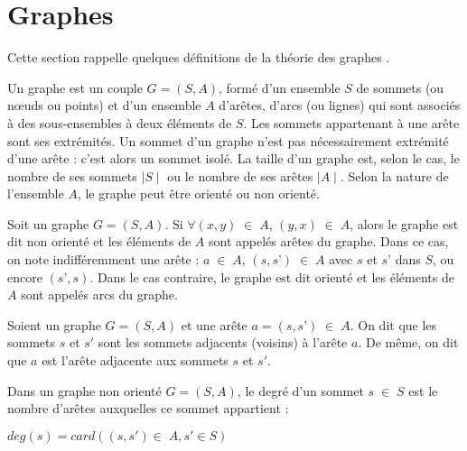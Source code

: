 
\section{Graphes}
Cette section rappelle quelques définitions de la théorie des graphes \citep{Francois2013}.

\begin{definition}[Graphe]
	Un graphe est un couple $G= (S, A)$, formé d'un ensemble $S$ de sommets (ou nœuds ou points) et d'un ensemble $A$ d'arêtes, d'arcs (ou lignes) qui sont associés à des sous-ensembles à deux éléments de $S$. Les sommets appartenant à une arête sont ses extrémités. Un sommet d'un graphe n'est pas nécessairement extrémité d'une arête : c'est alors un sommet isolé. La taille d'un graphe est, selon le cas, le nombre de ses sommets $\mid S \mid$ ou le nombre de ses arêtes $\mid A \mid $. Selon la nature de l'ensemble $A$, le graphe peut être orienté ou non orienté.
\end{definition}

\begin{definition}
	Soit un graphe $G = (S, A)$. Si $\forall (x, y) \;\in\; A$, $(y, x) \;\in\; A$, alors le graphe est dit non orienté et les éléments de $A$ sont appelés arêtes du graphe. Dans ce cas, on note indifféremment une arête : $a \;\in\; A$, $(s, s’) \;\in\; A$ avec $s$ et $s’$ dans $S$, ou encore $(s’, s)$. Dans le cas contraire, le graphe est dit orienté et les éléments de $A$ sont appelés arcs du graphe.
\end{definition}

\begin{definition}[Adjacence]
Soient un graphe $G = (S, A)$ et une arête $a = (s, s’) \;\in\; A$. On dit que les sommets $s$ et $s'$ sont les sommets adjacents (voisins) à l'arête $a$. De même, on dit que $a$ est l'arête adjacente aux sommets $s$ et $s'$.

\end{definition}

\begin{definition}
Dans un graphe non orienté $G = (S, A)$, le degré d'un sommet $s \;\in\; S$ est le nombre d'arêtes auxquelles ce sommet appartient :
\begin{center}
	$deg(s) = card({(s, s') \in\; A, s' \in S})$
\end{center}
\end{definition}

